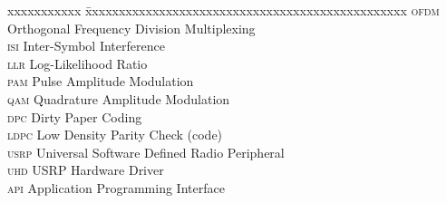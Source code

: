 \abbreviations

\noindent
\begin{tabbing}
	xxxxxxxxxxx \= xxxxxxxxxxxxxxxxxxxxxxxxxxxxxxxxxxxxxxxxxxxxxxxx \kill
	\textsc{ofdm} \> Orthogonal Frequency Division Multiplexing \\
	\textsc{isi}  \> Inter-Symbol Interference \\
	\textsc{llr}  \> Log-Likelihood Ratio \\
	\textsc{pam}  \> Pulse Amplitude Modulation \\
	\textsc{qam}  \> Quadrature Amplitude Modulation \\
	\textsc{dpc}  \> Dirty Paper Coding \\
	\textsc{ldpc} \> Low Density Parity Check (code) \\
	\textsc{usrp} \> Universal Software Defined Radio Peripheral \\
	\textsc{uhd}  \> USRP Hardware Driver \\
	\textsc{api}  \> Application Programming Interface \\
\end{tabbing}
